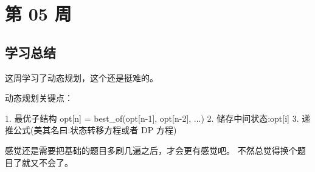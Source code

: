 \newpage
\section{第 05 周}



\subsection{学习总结}

这周学习了动态规划，这个还是挺难的。

动态规划关键点：

1. 最优子结构 opt[n] = best_of(opt[n-1], opt[n-2], ...)
2. 储存中间状态:opt[i]
3. 递推公式(美其名曰:状态转移方程或者 DP 方程)

感觉还是需要把基础的题目多刷几遍之后，才会更有感觉吧。
不然总觉得换个题目了就又不会了。
